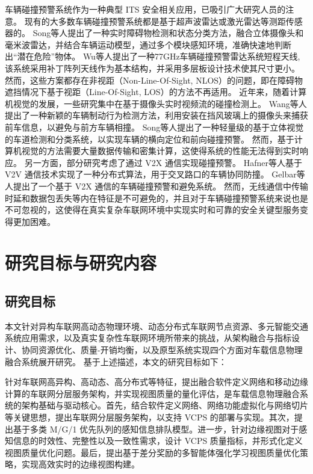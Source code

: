 车辆碰撞预警系统作为一种典型 ITS 安全相关应用，已吸引广大研究人员的注意。
现有的大多数车辆碰撞预警系统都是基于超声波雷达或激光雷达等测距传感器的。
Song等人\cite{song2018real}提出了一种实时障碍物检测和状态分类方法，融合立体摄像头和毫米波雷达，并结合车辆运动模型，通过多个模块感知环境，准确快速地判断出“潜在危险”物体。
Wu等人\cite{wu2019series}提出了一种77GHz车辆碰撞预警雷达系统短程天线,该系统采用补丁阵列天线作为基本结构，并采用多层板设计技术使其尺寸更小。
然而，这些方案都存在非视距（Non-Line-Of-Sight, NLOS）的问题，即在障碍物遮挡情况下基于视距（Line-Of-Sight, LOS）的方法不再适用。
近年来，随着计算机视觉的发展，一些研究集中在基于摄像头实时视频流的碰撞检测上。
Wang等人\cite{wang2016vision}提出了一种新颖的车辆制动行为检测方法，利用安装在挡风玻璃上的摄像头来捕获前车信息，以避免与前方车辆相撞。
Song等人\cite{song2018lane}提出了一种轻量级的基于立体视觉的车道检测和分类系统，以实现车辆的横向定位和前向碰撞预警。
然而，基于计算机视觉的方法需要大量数据传输和密集计算，这使得系统的性能无法得到实时响应。 
另一方面，部分研究考虑了通过 V2X 通信实现碰撞预警。
Hafner等人\cite{hafner2013cooperative}基于 V2V 通信技术实现了一种分布式算法，用于交叉路口的车辆协同防撞。
Gelbar等人\cite{gelbal2017elastic}提出了一个基于 V2X 通信的车辆碰撞预警和避免系统。
然而，无线通信中传输时延和数据包丢失等内在特征是不可避免的，并且对于车辆碰撞预警系统来说也是不可忽视的，这使得在真实复杂车联网环境中实现实时和可靠的安全关键型服务变得更加困难。

\section{研究目标与研究内容}\label{section 1-4}

\subsection{研究目标}

本文针对异构车联网高动态物理环境、动态分布式车联网节点资源、多元智能交通系统应用需求，以及真实复杂性车联网环境所带来的挑战，从架构融合与指标设计、协同资源优化、质量-开销均衡，以及原型系统实现四个方面对车载信息物理融合系统展开研究。
基于上述描述，本文的研究目标如下：

 针对车联网高异构、高动态、高分布式等特征，提出融合软件定义网络和移动边缘计算的车联网分层服务架构，并实现视图质量的量化评估，是车载信息物理融合系统的架构基础与驱动核心。首先，结合软件定义网络、网络功能虚拟化与网络切片等关键思想，提出车联网分层服务架构，以支持 VCPS 的部署与实现。其次，提出基于多类 M/G/1 优先队列的感知信息排队模型。进一步，针对边缘视图对于感知信息的时效性、完整性以及一致性需求，设计 VCPS 质量指标，并形式化定义视图质量优化问题。最后，提出基于差分奖励的多智能体强化学习视图质量优化策略，实现高效实时的边缘视图构建。

